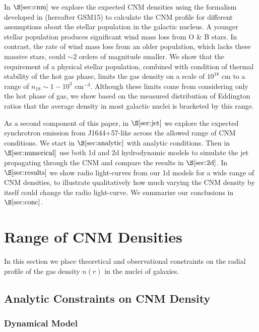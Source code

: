 \documentclass[usenatbib,fleqn]{mnras}
\begin{document}
In $\S\ref{sec:cnm}$ we explore the expected CNM densities using the
formalism developed in \citet{Generozov+2015} (hereafter GSM15) to
calculate the CNM profile for different assumptions about the stellar
population in the galactic nucleus.  A younger stellar population
produces significant wind mass loss from O \& B stars. In contrast,
the rate of wind mass loss from an older population, which lacks these
massive stars, could $\sim 2$ orders of magnitude smaller.  We show
that the requirement of a physical stellar population, combined with
condition of thermal stability of the hot gas phase, limits the gas
density on a scale of $10^{18}$ cm to a range of $n_{18} \sim
1-10^{3}$ cm$^{-3}$.  Although these limits come from considering
only the hot phase of gas, we show based on the measured distribution
of Eddington ratios that the average density in most galactic nuclei
is bracketed by this range. 

As a second component of this paper, in $\S\ref{sec:jet}$ we
explore the expected synchrotron emission from J1644+57-like across
the allowed range of CNM conditions.  We start in
$\S\ref{sec:analytic}$ with analytic conditions.  Then in
$\S\ref{sec:numerical}$ use both 1d and 2d hydrodynamic models to
simulate the jet propagating through the CNM and compare the results
in $\S\ref{sec:2d}$. In $\S\ref{sec:results}$ we show radio
light-curves from our 1d models for a wide range of CNM densities, to
illustrate qualitatively how much varying the CNM density by itself
could change the radio light-curve.  We summarize our conclusions in
$\S\ref{sec:conc}$.

\section{Range of CNM Densities}
\label{sec:cnm}

In this section we place theoretical and observational constraints on
the radial profile of the gas density $n(r)$ in the nuclei of
galaxies. 

\subsection{Analytic Constraints on CNM Density}

\subsubsection{Dynamical Model}
\label{sec:model}
\end{document}
